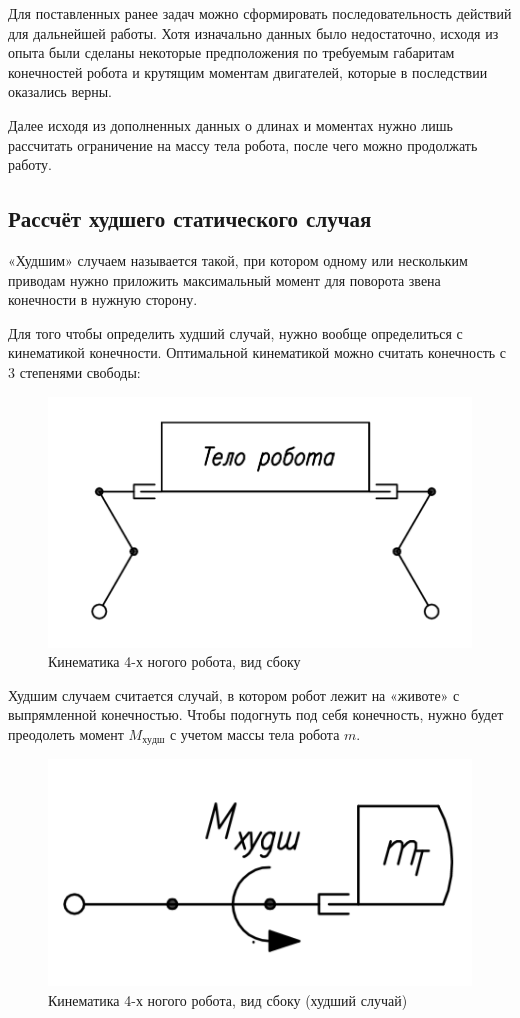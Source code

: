 Для поставленных ранее задач можно сформировать последовательность действий для дальнейшей работы. Хотя изначально данных было недостаточно, исходя из опыта были сделаны некоторые предположения по требуемым габаритам конечностей робота и крутящим моментам двигателей, которые в последствии оказались верны.

Далее исходя из дополненных данных о длинах и моментах нужно лишь рассчитать ограничение на массу тела робота, после чего можно продолжать работу.

\subsection{Рассчёт худшего статического случая}

«Худшим» случаем называется такой, при котором одному или нескольким приводам нужно приложить максимальный момент для поворота звена конечности в нужную сторону.

Для того чтобы определить худший случай, нужно вообще определиться с кинематикой конечности. Оптимальной кинематикой можно считать конечность с 3 степенями свободы:

\begin{figure}[ht]
    \centering
    \includegraphics[scale=0.7]{kin1.png}
    \caption{Кинематика 4-х ногого робота, вид сбоку}
\end{figure}

Худшим случаем считается случай, в котором робот лежит на «животе» с выпрямленной конечностью. Чтобы подогнуть под себя конечность, нужно будет преодолеть момент $M_{худш}$ с учетом массы тела робота $m$.

\begin{figure}[ht]
    \centering
    \includegraphics[scale=1]{kin2.png}
    \caption{Кинематика 4-х ногого робота, вид сбоку (худший случай)}
\end{figure}

